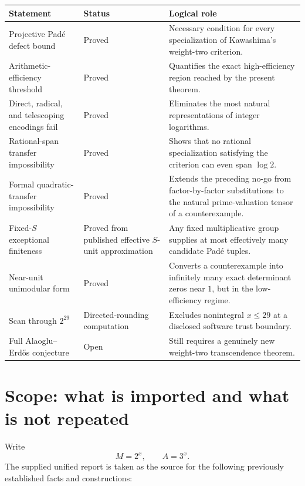 \documentclass[11pt]{article}
\theoremstyle{definition}
\begin{document}
\begin{center}
\begin{tabularx}{\textwidth}{@{}>{\raggedright\arraybackslash}p{}
                                  >{\raggedright\arraybackslash}p{}X@{}}
\toprule
Statement & Status & Logical role \\
\midrule
Projective Pad\'e defect bound & Proved & Necessary condition for every specialization of Kawashima's weight-two criterion. \\
Arithmetic-efficiency threshold & Proved & Quantifies the exact high-efficiency region reached by the present theorem. \\
Direct, radical, and telescoping encodings fail & Proved & Eliminates the most natural representations of integer logarithms. \\
Rational-span transfer impossibility & Proved & Shows that no rational specialization satisfying the criterion can even span $\log 2$. \\
Formal quadratic-transfer impossibility & Proved & Extends the preceding no-go from factor-by-factor substitutions to the natural prime-valuation tensor of a counterexample. \\
Fixed-$S$ exceptional finiteness & Proved from published effective $S$-unit approximation & Any fixed multiplicative group supplies at most effectively many candidate Pad\'e tuples. \\
Near-unit unimodular form & Proved & Converts a counterexample into infinitely many exact determinant zeros near $1$, but in the low-efficiency regime. \\
Scan through $2^{29}$ & Directed-rounding computation & Excludes nonintegral $x\le 29$ at a disclosed software trust boundary. \\
Full Alaoglu--Erd\H{o}s conjecture & Open & Still requires a genuinely new weight-two transcendence theorem. \\
\bottomrule
\end{tabularx}
\end{center}

\section{Scope: what is imported and what is not repeated}

Write
\[
  M=2^x,\qquad A=3^x.
\]
The supplied unified report is taken as the source for the following previously established
facts and constructions:
\end{document}
